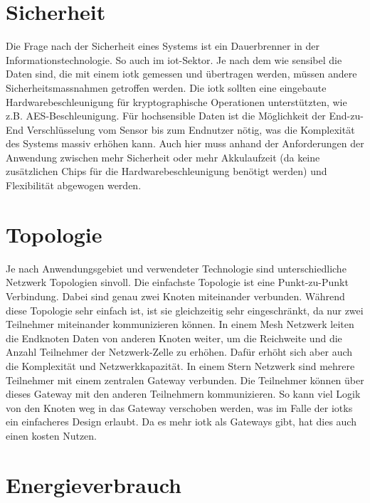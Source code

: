 \section{Sicherheit}

Die Frage nach der Sicherheit eines Systems ist ein Dauerbrenner in der Informationstechnologie. So auch im \acrshort{iot}-Sektor. Je nach dem wie sensibel die Daten sind, die mit einem \gls{iotk} gemessen und übertragen werden, müssen andere Sicherheitsmassnahmen getroffen werden. Die \gls{iotk} sollten eine eingebaute Hardwarebeschleunigung für kryptographische Operationen unterstützten, wie z.B. AES-Beschleunigung. Für hochsensible Daten ist die Möglichkeit der End-zu-End Verschlüsselung vom Sensor bis zum Endnutzer nötig, was die Komplexität des Systems massiv erhöhen kann. Auch hier muss anhand der Anforderungen der Anwendung zwischen mehr Sicherheit oder mehr Akkulaufzeit (da keine zusätzlichen Chips für die Hardwarebeschleunigung benötigt werden) und Flexibilität abgewogen werden.

\section{Topologie}

Je nach Anwendungsgebiet und verwendeter Technologie sind unterschiedliche Netzwerk Topologien sinvoll. Die einfachste Topologie ist eine Punkt-zu-Punkt Verbindung. Dabei sind genau zwei Knoten miteinander verbunden. Während diese Topologie sehr einfach ist, ist sie gleichzeitig sehr eingeschränkt, da nur zwei Teilnehmer miteinander kommunizieren können. In einem Mesh Netzwerk leiten die Endknoten Daten von anderen Knoten weiter, um die Reichweite und die Anzahl Teilnehmer der Netzwerk-Zelle zu erhöhen. Dafür erhöht sich aber auch die Komplexität und Netzwerkkapazität. In einem Stern Netzwerk sind mehrere Teilnehmer mit einem zentralen Gateway verbunden. Die Teilnehmer können über dieses Gateway mit den anderen Teilnehmern kommunizieren. So kann viel Logik von den Knoten weg in das Gateway verschoben werden, was im Falle der \glspl{iotk} ein einfacheres Design erlaubt. Da es mehr \gls{iotk} als Gateways gibt, hat dies auch einen kosten Nutzen.

\section{Energieverbrauch}

